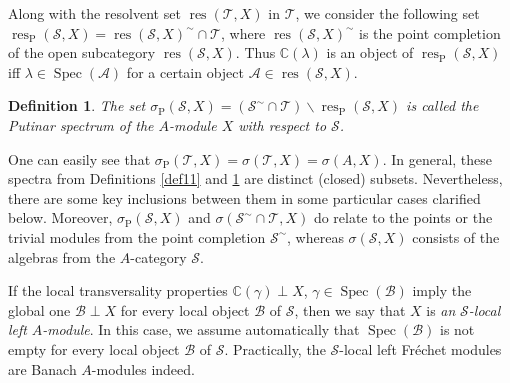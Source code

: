 \documentclass[12pt]{amsart}%
\theoremstyle{plain}
\newtheorem{definition}{Definition}
\numberwithin{equation}{section}
\numberwithin{equation}{section}
\numberwithin{theorem}{section}
\numberwithin{lemma}{section}
\numberwithin{remark}{section}
\numberwithin{example}{section}
\numberwithin{proposition}{section}
\numberwithin{definition}{section}
\numberwithin{corollary}{section}
\begin{document}
Along with the resolvent set $\operatorname{res}\left(  \mathcal{T},X\right)
$ in $\mathcal{T}$, we consider the following set $\operatorname{res}%
_{\operatorname{P}}\left(  \mathcal{S},X\right)  =\operatorname{res}\left(
\mathcal{S},X\right)  ^{\sim}\cap\mathcal{T}$, where $\operatorname{res}%
\left(  \mathcal{S},X\right)  ^{\sim}$ is the point completion of the open
subcategory $\operatorname{res}\left(  \mathcal{S},X\right)  $. Thus
$\mathbb{C}\left(  \lambda\right)  $ is an object of $\operatorname{res}%
_{\operatorname{P}}\left(  \mathcal{S},X\right)  $ iff $\lambda\in
\operatorname{Spec}\left(  \mathcal{A}\right)  $ for a certain object
$\mathcal{A}\in\operatorname{res}\left(  \mathcal{S},X\right)  $.

\begin{definition}
\label{def12}The set $\sigma_{\operatorname{P}}\left(  \mathcal{S},X\right)
=\left(  \mathcal{S}^{\sim}\cap\mathcal{T}\right)  \backslash
\operatorname{res}_{\operatorname{P}}\left(  \mathcal{S},X\right)  $ is called
\textit{the Putinar spectrum of the }$A$-\textit{module }$X$ \textit{with
respect to} $\mathcal{S}$.
\end{definition}

One can easily see that $\sigma_{\operatorname{P}}\left(  \mathcal{T}%
,X\right)  =\sigma\left(  \mathcal{T},X\right)  =\sigma\left(  A,X\right)  $.
In general, these spectra from Definitions \ref{def11} and \ref{def12} are
distinct (closed) subsets. Nevertheless, there are some key inclusions between
them in some particular cases clarified below. Moreover, $\sigma
_{\operatorname{P}}\left(  \mathcal{S},X\right)  $ and $\sigma\left(
\mathcal{S}^{\sim}\cap\mathcal{T},X\right)  $ do relate to the points or the
trivial modules from the point completion $\mathcal{S}^{\sim}$, whereas
$\sigma\left(  \mathcal{S},X\right)  $ consists of the algebras from the
$A$-category $\mathcal{S}$.

If the local transversality properties $\mathbb{C}\left(  \gamma\right)  \perp
X$, $\gamma\in\operatorname{Spec}\left(  \mathcal{B}\right)  $ imply the
global one $\mathcal{B}\perp X$ for every local object $\mathcal{B}$ of
$\mathcal{S}$, then we say that $X$ is \textit{an }$\mathcal{S}$\textit{-local
left }$A$\textit{-module}. In this case, we assume automatically that
$\operatorname{Spec}\left(  \mathcal{B}\right)  $ is not empty for every local
object $\mathcal{B}$ of $\mathcal{S}$. Practically, the $\mathcal{S}$-local
left Fr\'{e}chet modules are Banach $A$-modules indeed.
\end{document}
